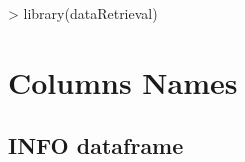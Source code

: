 \documentclass[a4paper,11pt]{article}
\begin{document}
\begin{Schunk}
\begin{Sinput}
> library(dataRetrieval)
\end{Sinput}
\end{Schunk}

\section{Columns Names}
\label{sec:appendix2}

\subsection{INFO dataframe}
\label{sec:appendix2INFO}
\end{document}
